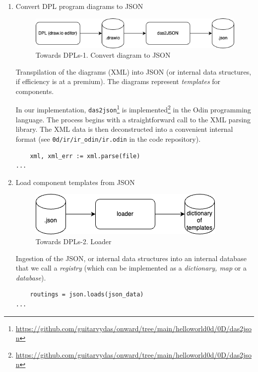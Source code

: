 \documentclass[10pt]{acmart}
\begin{document}
\begin{enumerate}
\item Convert DPL program diagrams to JSON

  \begin{figure}[h]
    \centering
    \includegraphics[width=0.8\linewidth]{./media/image2.png}
    \caption{Towards DPLs-1. Convert diagram to JSON}
    \label{fig:convert_to_json}
  \end{figure}

  Transpilation of the diagrams (XML) into JSON (or internal data structures, if efficiency is at a premium). The diagrams represent \emph{templates} for components.
  
  In our implementation, \texttt{das2json}\footnote{\url{https://github.com/guitarvydas/onward/tree/main/helloworld0d/0D/das2json}} is implemented\footnote{\url{https://github.com/guitarvydas/onward/tree/main/helloworld0d/0D/das2json}} in the Odin programming language. The process begins with a straightforward call to the XML parsing library. The XML data is then deconstructed into a convenient internal format (see \texttt{0d/ir/ir\_odin/ir.odin} in the code repository).

\begin{verbatim}
    xml, xml_err := xml.parse(file)
...
\end{verbatim}
  
\item Load component templates from JSON

  \begin{figure}[h]
    \centering
    \includegraphics[width=0.6\linewidth]{./media/image3.png}
    \caption{Towards DPLs-2. Loader}
    \label{fig:load_templates}
  \end{figure}

  Ingestion of the JSON, or internal data structures into an internal database that we call a \emph{registry} (which can be implemented as a \emph{dictionary, map} or a \emph{database}).

\begin{verbatim}
    routings = json.loads(json_data)
...
\end{verbatim}


\end{enumerate}
\end{document}
